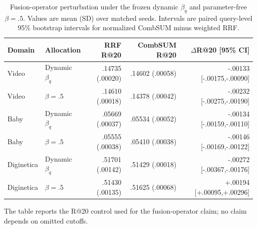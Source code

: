 \begin{table}[h]
\caption{Fusion-operator perturbation under the frozen dynamic $\beta_q$ and parameter-free $\beta=.5$. Values are mean (SD) over matched seeds. Intervals are paired query-level 95\% bootstrap intervals for normalized CombSUM minus weighted RRF.}
\label{tab:fusion-operator}
\centering\scriptsize
\setlength{\tabcolsep}{2pt}
\begin{tabular}{llrrr}
\toprule
Domain & Allocation & RRF R@20 & CombSUM R@20 & $\Delta$R@20 [95\% CI]\\
\midrule
Video & Dynamic $\beta_q$ & .14735 (.00020) & .14602 (.00058) & -.00133 [-.00175,-.00090]\\
Video & $\beta=.5$ & .14610 (.00018) & .14378 (.00042) & -.00232 [-.00275,-.00190]\\
Baby & Dynamic $\beta_q$ & .05669 (.00037) & .05534 (.00052) & -.00134 [-.00159,-.00110]\\
Baby & $\beta=.5$ & .05555 (.00038) & .05410 (.00038) & -.00146 [-.00169,-.00122]\\
Diginetica & Dynamic $\beta_q$ & .51701 (.00142) & .51429 (.00018) & -.00272 [-.00367,-.00176]\\
Diginetica & $\beta=.5$ & .51430 (.00135) & .51625 (.00068) & +.00194 [+.00095,+.00296]\\
\bottomrule
\end{tabular}
\par\smallskip\scriptsize The table reports the R@20 control used for the fusion-operator claim; no claim depends on omitted cutoffs.
\end{table}

